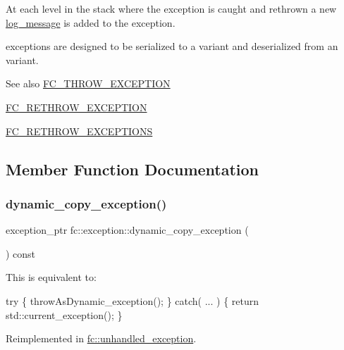 At each level in the stack where the exception is caught and rethrown a new \mbox{\hyperlink{classfc_1_1log__message}{log\+\_\+message}} is added to the exception. 

exception\textquotesingle{}s are designed to be serialized to a variant and deserialized from an variant.

\begin{DoxySeeAlso}{See also}
\mbox{\hyperlink{exception_8hpp_a7590ddac4f181b661c3eeaf5feccc6ac}{F\+C\+\_\+\+T\+H\+R\+O\+W\+\_\+\+E\+X\+C\+E\+P\+T\+I\+ON}} 

\mbox{\hyperlink{exception_8hpp_ad1d295500555ec25b5cc63a27c2eaa59}{F\+C\+\_\+\+R\+E\+T\+H\+R\+O\+W\+\_\+\+E\+X\+C\+E\+P\+T\+I\+ON}} 

\mbox{\hyperlink{exception_8hpp_af3731d6e3beb140d9e652adf7a18113b}{F\+C\+\_\+\+R\+E\+T\+H\+R\+O\+W\+\_\+\+E\+X\+C\+E\+P\+T\+I\+O\+NS}} 
\end{DoxySeeAlso}


\subsection{Member Function Documentation}
\mbox{\label{classfc_1_1exception_a38ac38d910ba13a339ce5855a51c9127}} 
\subsubsection{\texorpdfstring{dynamic\+\_\+copy\+\_\+exception()}{dynamic\_copy\_exception()}}
{\footnotesize\ttfamily exception\+\_\+ptr fc\+::exception\+::dynamic\+\_\+copy\+\_\+exception (\begin{DoxyParamCaption}{ }\end{DoxyParamCaption}) const\hspace{0.3cm}{\ttfamily [virtual]}}

This is equivalent to\+: 
\begin{DoxyCode}
\textcolor{keywordflow}{try} \{ throwAsDynamic\_exception(); \}
\textcolor{keywordflow}{catch}( ... ) \{ \textcolor{keywordflow}{return} std::current\_exception(); \}
\end{DoxyCode}
 

Reimplemented in \mbox{\hyperlink{classfc_1_1unhandled__exception_a7946c956fb83ac7167173be9fdcac3e8}{fc\+::unhandled\+\_\+exception}}.

